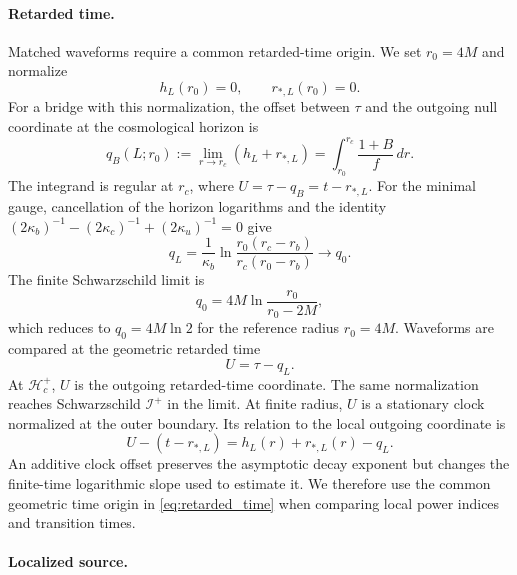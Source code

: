 \documentclass[
 aps,
 prd,
 reprint,
 superscriptaddress,
 nofootinbib,
 longbibliography
]{revtex4-2}
\newcommand{\scri}{\mathscr{I}}
\newcommand{\hc}{\mathcal{H}_{c}^{+}}
\begin{document}
\paragraph{Retarded time.}
Matched waveforms require a common retarded-time origin.  We set $r_0=4M$
and normalize
\begin{equation}
 h_L(r_0)=0,\qquad r_{*,L}(r_0)=0.
\end{equation}
For a bridge with this normalization, the offset between $\tau$ and the
outgoing null coordinate at the cosmological horizon is
\begin{equation}
 q_B(L;r_0):=\lim_{r\to r_c}(h_L+r_{*,L})
 =\int_{r_0}^{r_c}\frac{1+B}{f}\,dr.
 \label{eq:general_q}
\end{equation}
The integrand is regular at $r_c$, where $U=\tau-q_B=t-r_{*,L}$.
For the minimal gauge, cancellation of the horizon logarithms and the
identity $(2\kappa_b)^{-1}-(2\kappa_c)^{-1}+(2\kappa_u)^{-1}=0$ give
\begin{equation}
q_L=\frac{1}{\kappa_b}
\ln\frac{r_0(r_c-r_b)}{r_c(r_0-r_b)}
\longrightarrow q_0.
\label{eq:q_L}
\end{equation}
The finite Schwarzschild limit is
\begin{equation}
 q_0=4M\ln\frac{r_0}{r_0-2M},
 \label{eq:q_zero}
\end{equation}
which reduces to $q_0=4M\ln2$ for the reference radius $r_0=4M$.
Waveforms are compared at the geometric retarded time
\begin{equation}
 U=\tau-q_L.
\label{eq:retarded_time}
\end{equation}
At $\hc$, $U$ is the outgoing retarded-time coordinate.  The same
normalization reaches Schwarzschild $\scri^+$ in the limit.  At finite
radius, $U$ is a stationary clock normalized at the outer boundary.  Its
relation to the local outgoing coordinate is
\begin{equation}
 U-(t-r_{*,L})=h_L(r)+r_{*,L}(r)-q_L.
\label{eq:finite_radius_clock}
\end{equation}
An additive clock offset preserves the asymptotic decay exponent but changes
the finite-time logarithmic slope used to estimate it.  We therefore use the
common geometric time origin in \eqref{eq:retarded_time} when comparing local
power indices and transition times.

\paragraph{Localized source.}
\label{sec:localized_protocol}
\end{document}
